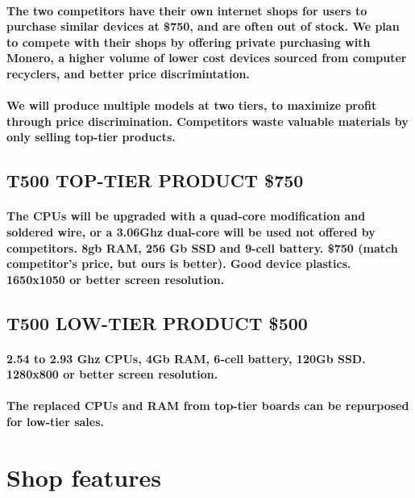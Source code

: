 \documentclass{article}
\begin{document}
\paragraph{The two competitors have their own internet shops for users to purchase
similar devices at \$750, and are often out of stock. We plan to compete
with their shops by offering private purchasing with Monero, a higher
volume of lower cost devices sourced from computer recyclers, and better
price discrimintation.}

\paragraph{We will produce multiple models at two tiers, to maximize profit through
price discrimination. Competitors waste valuable materials  by only
selling top-tier products.}

\subsection{T500 TOP-TIER PRODUCT \$750}
\paragraph{The CPUs will be
    upgraded with a quad-core modification and soldered wire, or a 3.06Ghz
    dual-core will be used not offered by competitors. 8gb RAM, 256 Gb SSD and
    9-cell battery. \$750 (match competitor's price, but ours is better). Good
    device plastics. 1650x1050 or better screen resolution.}

\subsection{T500 LOW-TIER PRODUCT \$500}
\paragraph{2.54 to 2.93 Ghz CPUs, 4Gb RAM, 6-cell battery, 120Gb
SSD. 1280x800 or better screen resolution.}

\paragraph{The replaced CPUs and RAM from top-tier boards can be repurposed for
low-tier sales.}

\section{Shop features}
\end{document}
